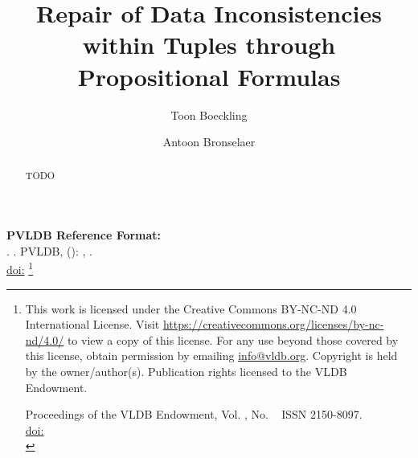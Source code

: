 \title{Repair of Data Inconsistencies within Tuples through Propositional Formulas}

\author{Toon Boeckling}

\author{Antoon Bronselaer}

\begin{abstract}
    TODO
\end{abstract}

\maketitle

\pagestyle{\vldbpagestyle}
\begingroup\small\noindent\raggedright\textbf{PVLDB Reference Format:}\\
\vldbauthors. \vldbtitle. PVLDB, \vldbvolume(\vldbissue): \vldbpages, \vldbyear.\\
\href{https://doi.org/\vldbdoi}{doi:\vldbdoi}
\endgroup
\begingroup
\renewcommand\thefootnote{}\footnote{\noindent
This work is licensed under the Creative Commons BY-NC-ND 4.0 International License. Visit \url{https://creativecommons.org/licenses/by-nc-nd/4.0/} to view a copy of this license. For any use beyond those covered by this license, obtain permission by emailing \href{mailto:info@vldb.org}{info@vldb.org}. Copyright is held by the owner/author(s). Publication rights licensed to the VLDB Endowment. \\
\raggedright Proceedings of the VLDB Endowment, Vol. \vldbvolume, No. \vldbissue\ %
ISSN 2150-8097. \\
\href{https://doi.org/\vldbdoi}{doi:\vldbdoi} \\
}\addtocounter{footnote}{-1}\endgroup


